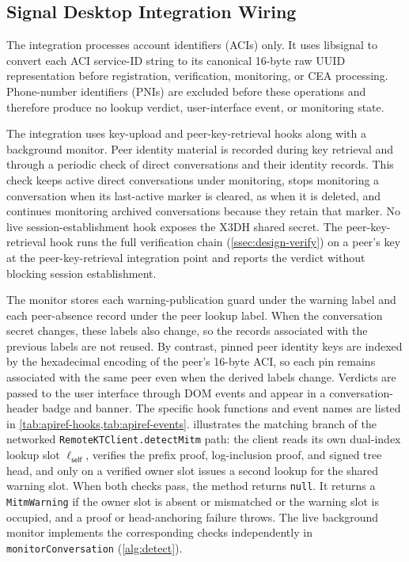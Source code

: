 \subsection{Signal Desktop Integration Wiring}\label{ssec:apiref-eng-wiring}

The integration processes account identifiers (ACIs) only. It uses libsignal to convert each ACI
service-ID string to its canonical 16-byte raw UUID representation before registration,
verification, monitoring,
or CEA processing. Phone-number identifiers (PNIs) are excluded before these operations and
therefore produce no lookup verdict, user-interface event, or monitoring state.

The integration uses key-upload and peer-key-retrieval hooks along with a background monitor. Peer
identity material is recorded during key retrieval and through a periodic check of direct
conversations and their identity records. This check keeps active direct conversations under
monitoring, stops monitoring a conversation when its last-active marker is cleared, as when it is
deleted, and continues monitoring archived conversations because they retain that marker. No live
session-establishment hook exposes the X3DH shared secret. The peer-key-retrieval hook runs the full
verification chain (\cref{ssec:design-verify}) on a peer's key at the peer-key-retrieval integration
point and reports the verdict without blocking session establishment.

The monitor stores each warning-publication guard under the warning label and each peer-absence
record under the peer lookup label. When the conversation secret changes, these labels also change,
so the records associated with the previous labels are not reused. By contrast, pinned peer
identity keys are indexed by the hexadecimal encoding of the peer's 16-byte ACI, so each pin
remains associated
with the same peer even when the derived labels change. Verdicts are passed to the user interface
through DOM events and appear in a conversation-header badge and banner. The specific hook
functions and event names are listed in
\cref{tab:apiref-hooks,tab:apiref-events}.
 illustrates the matching branch of the networked \texttt{RemoteKTClient.detectMitm}
path: the client reads its own dual-index lookup slot $\ell_{\mathsf{self}}$, verifies the prefix
proof, log-inclusion proof, and signed tree head, and only on a verified owner slot issues a second
lookup for the shared warning slot. When both checks pass, the method returns \texttt{null}. It returns a
\texttt{MitmWarning} if the owner slot is absent or mismatched or the warning slot is occupied, and a
proof or head-anchoring failure throws. The live background monitor implements the
corresponding checks independently in \texttt{monitorConversation} (\cref{alg:detect}).

